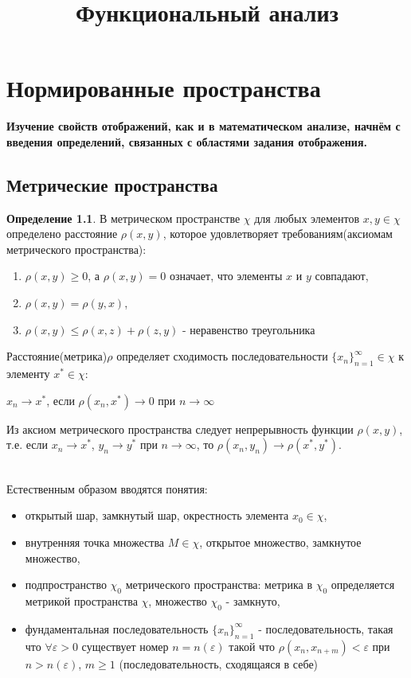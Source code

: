 \documentclass[12pt,a4paper,titlepage]{book}
\title{Функциональный анализ}
\theoremstyle{definition}
\newtheorem{definition}{Определение}
\theoremstyle{plain}
\theoremstyle{remark}
\theoremstyle{plain}
\begin{document}
\chapter{Нормированные пространства}
\par \textbf{Изучение свойств отображений, как и в математическом анализе, начнём с введения определений, связанных с областями задания отображения.}
\section{Метрические пространства}
\begin{definition}В метрическом пространстве $\chi$ для любых элементов $x,y\in \chi$ определено расстояние $\rho(x, y)$, которое удовлетворяет требованиям(аксиомам метрического пространства):
 \begin{enumerate}
 \item $\rho(x, y)\geqslant 0$, а $\rho(x, y)=0$ означает, что элементы $x$ и $y$ совпадают,
 \item $\rho(x, y)=\rho(y, x)$,
 \item $ \rho(x, y)\leqslant \rho(x, z) +\rho(z, y)$ - неравенство треугольника
 \end{enumerate} 
\end{definition}
\par Расстояние(метрика)$\rho$ определяет сходимость последовательности $\lbrace x_n \rbrace_{n=1}^{\infty}  \in \chi$ к элементу $x^{*}\in \chi$:
\begin{center}
	$x_n\rightarrow x^{*}$, если $\rho(x_n, x^{*})\rightarrow 0$ при $n\rightarrow\infty$
\end{center}
\par Из аксиом метрического пространства следует непрерывность функции $\rho(x, y)$, т.е. если $x_n\rightarrow x^{*}$, $y_n\rightarrow y^{*}$ при $n\rightarrow\infty$, то $\rho(x_n, y_n)\rightarrow \rho(x^*, y^*)$.
\\
\\
\par Естественным образом вводятся понятия:
\begin{itemize}
\item  открытый шар, замкнутый шар, окрестность элемента $x_0\in \chi$,
\item внутренняя точка множества $M \in \chi$, открытое множество, замкнутое множество,
\item подпространство $\chi_0$ метрического пространства: метрика в $\chi_0$ определяется метрикой пространства $\chi$, множество $\chi_0$ - замкнуто,
\item фундаментальная последовательность $\lbrace x_n \rbrace_{n=1}^{\infty}$ - последовательность, такая что $\forall \varepsilon>0$ существует номер $n=n(\varepsilon)$ такой что $\rho(x_n, x_{n+m})<\varepsilon$ при $n>n(\varepsilon)$, $m\geq1$ (последовательность, сходящаяся в себе)
\end{itemize}
\end{document}
